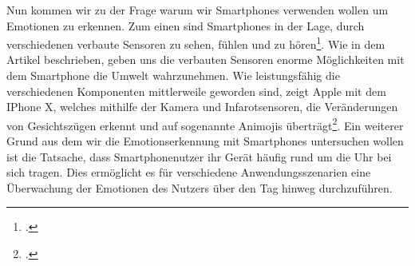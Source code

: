Nun kommen wir zu der Frage warum wir Smartphones verwenden wollen um Emotionen zu erkennen. Zum einen sind Smartphones in der Lage, durch verschiedenen verbaute Sensoren zu sehen, fühlen und zu hören\footcite[Vgl.][S. 1 Abs. 2]{Bie14}. Wie in dem Artikel beschrieben, geben uns die verbauten Sensoren enorme Möglichkeiten mit dem Smartphone die Umwelt wahrzunehmen. Wie leistungsfähig die verschiedenen Komponenten mittlerweile geworden sind, zeigt Apple mit dem IPhone X, welches mithilfe der Kamera und Infarotsensoren, die Veränderungen von Gesichtszügen erkennt und auf sogenannte Animojis überträgt\footcite[Vgl. ][Animoji: So funktioniert es]{Com17}. Ein weiterer Grund aus dem wir die Emotionserkennung mit Smartphones untersuchen wollen ist die Tatsache, dass Smartphonenutzer ihr Gerät häufig rund um die Uhr bei sich tragen. Dies ermöglicht es für verschiedene Anwendungsszenarien eine Überwachung der Emotionen des Nutzers über den Tag hinweg durchzuführen.
